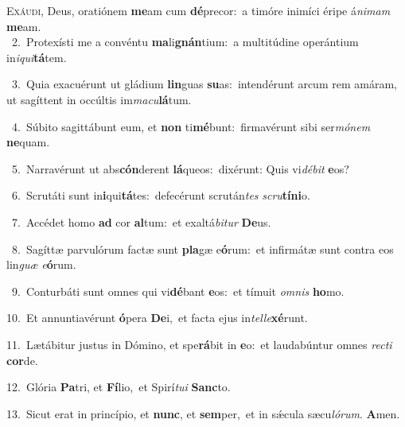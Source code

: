 \lettrine{\initial\textcolor{\initialcolor}{E}}{xáudi,} Deus, oratiónem \textbf{me}\-am cum \textbf{dé}\-precor:~\star a timóre inimíci éripe á\-\textit{ni}\-\textit{mam} \textbf{me}\-am.\\
{\numbfont\textcolor{\numbcolor}{~2.}}~Protexísti me a convéntu \textbf{ma}\-li\-\textbf{gnán}\-tium:~\star a multitúdine operántium in\-\textit{i}\-\textit{qui}\textbf{tá}tem.\par
{\numbfont\textcolor{\numbcolor}{~3.}}~Quia exacuérunt ut gládium \textbf{lin}\-guas \textbf{su}\-as:~\star intendérunt arcum rem amáram, ut sagíttent in occúltis im\-\textit{ma}\-\textit{cu}\textbf{lá}tum.\par
{\numbfont\textcolor{\numbcolor}{~4.}}~Súbito sagittábunt eum, et \textbf{non} ti\-\textbf{mé}\-bunt:~\star firmavérunt sibi ser\-\textit{mó}\-\textit{nem} \textbf{ne}\-quam.\par
{\numbfont\textcolor{\numbcolor}{~5.}}~Narravérunt ut abs\-\textbf{cón}\-derent \textbf{lá}\-queos:~\star dixérunt: Quis vi\-\textit{dé}\-\textit{bit} \textbf{e}\-os?\par
{\numbfont\textcolor{\numbcolor}{~6.}}~Scrutáti sunt in\-\textbf{i}\-qui\-\textbf{tá}\-tes:~\star defecérunt scrután\textit{tes} \textit{scru}\-\textbf{tí}\textbf{ni}o.\par
{\numbfont\textcolor{\numbcolor}{~7.}}~Accédet homo \textbf{ad} cor \textbf{al}\-tum:~\star et exaltá\-\textit{bi}\-\textit{tur} \textbf{De}\-us.\par
{\numbfont\textcolor{\numbcolor}{~8.}}~Sagíttæ parvulórum factæ sunt \textbf{pla}\-gæ e\-\textbf{ó}\-rum:~\star et infirmátæ sunt contra eos lin\textit{guæ} \textit{e}\-\textbf{ó}rum.\par
{\numbfont\textcolor{\numbcolor}{~9.}}~Conturbáti sunt omnes qui vi\-\textbf{dé}\-bant \textbf{e}\-os:~\star et tímuit \textit{om}\-\textit{nis} \textbf{ho}\-mo.\par
{\numbfont\textcolor{\numbcolor}{10.}}~Et annuntiavérunt \textbf{ó}\-pera \textbf{De}\-i,~\star et facta ejus in\-\textit{tel}\-\textit{le}\textbf{xé}runt.\par
{\numbfont\textcolor{\numbcolor}{11.}}~Lætábitur justus in Dómino, et spe\-\textbf{rá}\-bit in \textbf{e}\-o:~\star et laudabúntur omnes \textit{rec}\-\textit{ti} \textbf{cor}\-de.\par
{\numbfont\textcolor{\numbcolor}{12.}}~Glória \textbf{Pa}\-tri, et \textbf{Fí}\-lio,~\star et Spirí\-\textit{tu}\-\textit{i} \textbf{Sanc}\-to.\par
{\numbfont\textcolor{\numbcolor}{13.}}~Sicut erat in princípio, et \textbf{nunc}\-, et \textbf{sem}\-per,~\star et in sǽcula sæcu\-\textit{ló}\-\textit{rum}. \textbf{A}\-men.\par
